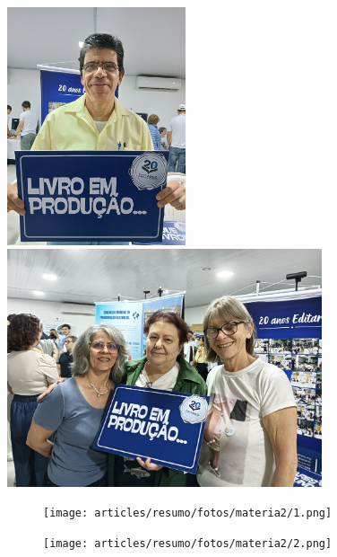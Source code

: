 \documentclass{gescons}
\begin{document}
  \begin{center}
    \includegraphics[height=7cm]{articles/resumo/fotos/materia2/IMG20241208144653.jpg}
    \hspace{2.5mm}
    \includegraphics[height=7cm]{articles/resumo/fotos/materia2/IMG20241208155101.jpg}
  \end{center}




\clearpage %
\begin{figure}[p] %
  \centering
  \texttt{[image: articles/resumo/fotos/materia2/1.png]}
  \caption*{} %
\end{figure}
\clearpage

\clearpage %
\begin{figure}[p] %
  \centering
  \texttt{[image: articles/resumo/fotos/materia2/2.png]}
  \caption*{} %
\end{figure}
\clearpage

        
\end{document}
